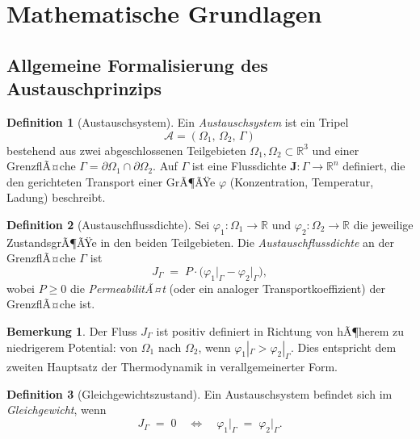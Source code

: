 ﻿\documentclass[a4paper,12pt]{article}
\theoremstyle{definition}
\newtheorem{definition}{Definition}
\newtheorem{bemerkung}{Bemerkung}
\begin{document}
\section{Mathematische Grundlagen}

\subsection{Allgemeine Formalisierung des Austauschprinzips}

\begin{definition}[Austauschsystem]
    Ein \emph{Austauschsystem} ist ein Tripel
    \[
        \mathcal{A} = (\Omega_1,\, \Omega_2,\, \Gamma)
    \]
    bestehend aus zwei abgeschlossenen Teilgebieten $\Omega_1, \Omega_2 \subset \mathbb{R}^3$
    und einer GrenzflÃ¤che $\Gamma = \partial\Omega_1 \cap \partial\Omega_2$.
    Auf $\Gamma$ ist eine Flussdichte $\mathbf{J}: \Gamma \to \mathbb{R}^n$ definiert,
    die den gerichteten Transport einer GrÃ¶ÃŸe $\varphi$ (Konzentration, Temperatur, Ladung)
    beschreibt.
\end{definition}

\begin{definition}[Austauschflussdichte]
    Sei $\varphi_1: \Omega_1 \to \mathbb{R}$ und $\varphi_2: \Omega_2 \to \mathbb{R}$
    die jeweilige ZustandsgrÃ¶ÃŸe in den beiden Teilgebieten.
    Die \emph{Austauschflussdichte} an der GrenzflÃ¤che $\Gamma$ ist
    \[
        J_{\Gamma} \;=\; P \cdot \bigl(\varphi_1\big|_{\Gamma} - \varphi_2\big|_{\Gamma}\bigr),
    \]
    wobei $P \geq 0$ die \emph{PermeabilitÃ¤t} (oder ein analoger Transportkoeffizient)
    der GrenzflÃ¤che ist.
\end{definition}

\begin{bemerkung}
    Der Fluss $J_\Gamma$ ist positiv definiert in Richtung von hÃ¶herem zu niedrigerem
    Potential: von $\Omega_1$ nach $\Omega_2$, wenn $\varphi_1|_\Gamma > \varphi_2|_\Gamma$.
    Dies entspricht dem zweiten Hauptsatz der Thermodynamik in verallgemeinerter Form.
\end{bemerkung}

\begin{definition}[Gleichgewichtszustand]
    Ein Austauschsystem befindet sich im \emph{Gleichgewicht}, wenn
    \[
        J_\Gamma \;=\; 0 \quad \Longleftrightarrow \quad \varphi_1\big|_\Gamma \;=\; \varphi_2\big|_\Gamma.
    \]
\end{definition}
\end{document}
